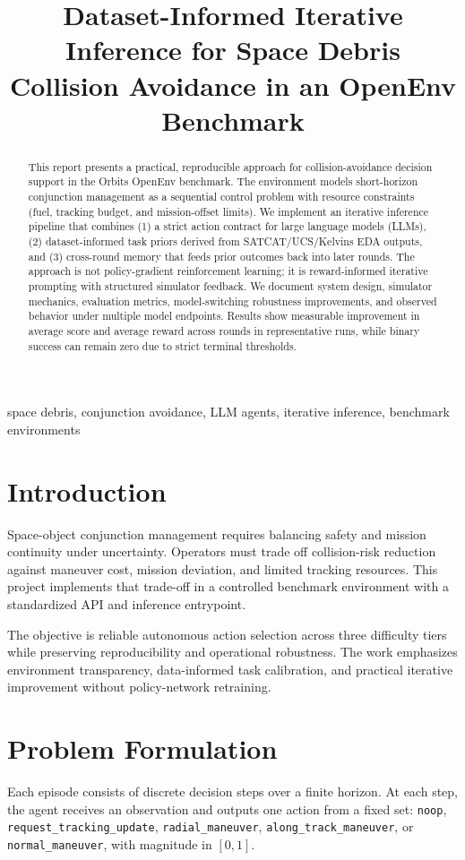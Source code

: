 \documentclass[conference]{IEEEtran}
\title{Dataset-Informed Iterative Inference for Space Debris Collision Avoidance in an OpenEnv Benchmark}
\author{\IEEEauthorblockN{Project Report}
\IEEEauthorblockA{Orbits OpenEnv Study}}
\begin{document}
\maketitle

\begin{abstract}
This report presents a practical, reproducible approach for collision-avoidance decision support in the Orbits OpenEnv benchmark. The environment models short-horizon conjunction management as a sequential control problem with resource constraints (fuel, tracking budget, and mission-offset limits). We implement an iterative inference pipeline that combines (1) a strict action contract for large language models (LLMs), (2) dataset-informed task priors derived from SATCAT/UCS/Kelvins EDA outputs, and (3) cross-round memory that feeds prior outcomes back into later rounds. The approach is not policy-gradient reinforcement learning; it is reward-informed iterative prompting with structured simulator feedback. We document system design, simulator mechanics, evaluation metrics, model-switching robustness improvements, and observed behavior under multiple model endpoints. Results show measurable improvement in average score and average reward across rounds in representative runs, while binary success can remain zero due to strict terminal thresholds.
\end{abstract}

\begin{IEEEkeywords}
space debris, conjunction avoidance, LLM agents, iterative inference, benchmark environments
\end{IEEEkeywords}

\section{Introduction}
Space-object conjunction management requires balancing safety and mission continuity under uncertainty. Operators must trade off collision-risk reduction against maneuver cost, mission deviation, and limited tracking resources. This project implements that trade-off in a controlled benchmark environment with a standardized API and inference entrypoint.

The objective is reliable autonomous action selection across three difficulty tiers while preserving reproducibility and operational robustness. The work emphasizes environment transparency, data-informed task calibration, and practical iterative improvement without policy-network retraining.

\section{Problem Formulation}
Each episode consists of discrete decision steps over a finite horizon. At each step, the agent receives an observation and outputs one action from a fixed set:
\texttt{noop}, \texttt{request\_tracking\_update}, \texttt{radial\_maneuver}, \texttt{along\_track\_maneuver}, or \texttt{normal\_maneuver}, with magnitude in $[0,1]$.
\end{document}
